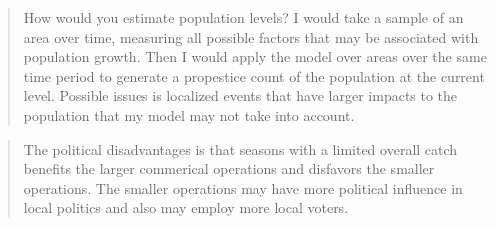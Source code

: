 \documentclass[]{article}
\begin{document}
\begin{quote}
How would you estimate population levels? I would take a sample of an
area over time, measuring all possible factors that may be associated
with population growth. Then I would apply the model over areas over the
same time period to generate a propestice count of the population at the
current level. Possible issues is localized events that have larger
impacts to the population that my model may not take into account.
\end{quote}

\begin{quote}
The political disadvantages is that seasons with a limited overall catch
benefits the larger commerical operations and disfavors the smaller
operations. The smaller operations may have more political influence in
local politics and also may employ more local voters.
\end{quote}
\end{document}
